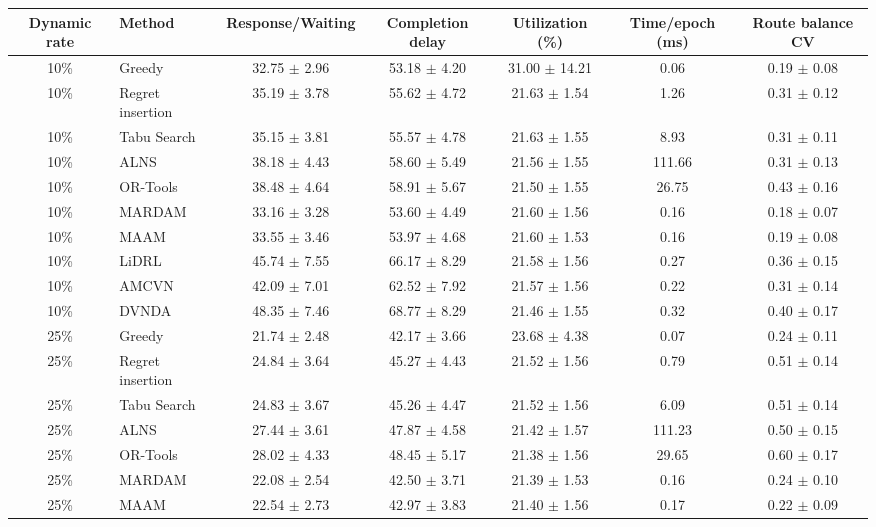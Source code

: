 \begin{tabular}{clccccc}
\toprule
Dynamic rate & Method & Response/Waiting & Completion delay & Utilization (\%) & Time/epoch (ms) & Route balance CV \\
\midrule
10\% & Greedy & 32.75 $\pm$ 2.96 & 53.18 $\pm$ 4.20 & 31.00 $\pm$ 14.21 & 0.06 & 0.19 $\pm$ 0.08 \\
10\% & Regret insertion & 35.19 $\pm$ 3.78 & 55.62 $\pm$ 4.72 & 21.63 $\pm$ 1.54 & 1.26 & 0.31 $\pm$ 0.12 \\
10\% & Tabu Search & 35.15 $\pm$ 3.81 & 55.57 $\pm$ 4.78 & 21.63 $\pm$ 1.55 & 8.93 & 0.31 $\pm$ 0.11 \\
10\% & ALNS & 38.18 $\pm$ 4.43 & 58.60 $\pm$ 5.49 & 21.56 $\pm$ 1.55 & 111.66 & 0.31 $\pm$ 0.13 \\
10\% & OR-Tools & 38.48 $\pm$ 4.64 & 58.91 $\pm$ 5.67 & 21.50 $\pm$ 1.55 & 26.75 & 0.43 $\pm$ 0.16 \\
10\% & MARDAM & 33.16 $\pm$ 3.28 & 53.60 $\pm$ 4.49 & 21.60 $\pm$ 1.56 & 0.16 & 0.18 $\pm$ 0.07 \\
10\% & MAAM & 33.55 $\pm$ 3.46 & 53.97 $\pm$ 4.68 & 21.60 $\pm$ 1.53 & 0.16 & 0.19 $\pm$ 0.08 \\
10\% & LiDRL & 45.74 $\pm$ 7.55 & 66.17 $\pm$ 8.29 & 21.58 $\pm$ 1.56 & 0.27 & 0.36 $\pm$ 0.15 \\
10\% & AMCVN & 42.09 $\pm$ 7.01 & 62.52 $\pm$ 7.92 & 21.57 $\pm$ 1.56 & 0.22 & 0.31 $\pm$ 0.14 \\
10\% & DVNDA & 48.35 $\pm$ 7.46 & 68.77 $\pm$ 8.29 & 21.46 $\pm$ 1.55 & 0.32 & 0.40 $\pm$ 0.17 \\
25\% & Greedy & 21.74 $\pm$ 2.48 & 42.17 $\pm$ 3.66 & 23.68 $\pm$ 4.38 & 0.07 & 0.24 $\pm$ 0.11 \\
25\% & Regret insertion & 24.84 $\pm$ 3.64 & 45.27 $\pm$ 4.43 & 21.52 $\pm$ 1.56 & 0.79 & 0.51 $\pm$ 0.14 \\
25\% & Tabu Search & 24.83 $\pm$ 3.67 & 45.26 $\pm$ 4.47 & 21.52 $\pm$ 1.56 & 6.09 & 0.51 $\pm$ 0.14 \\
25\% & ALNS & 27.44 $\pm$ 3.61 & 47.87 $\pm$ 4.58 & 21.42 $\pm$ 1.57 & 111.23 & 0.50 $\pm$ 0.15 \\
25\% & OR-Tools & 28.02 $\pm$ 4.33 & 48.45 $\pm$ 5.17 & 21.38 $\pm$ 1.56 & 29.65 & 0.60 $\pm$ 0.17 \\
25\% & MARDAM & 22.08 $\pm$ 2.54 & 42.50 $\pm$ 3.71 & 21.39 $\pm$ 1.53 & 0.16 & 0.24 $\pm$ 0.10 \\
25\% & MAAM & 22.54 $\pm$ 2.73 & 42.97 $\pm$ 3.83 & 21.40 $\pm$ 1.56 & 0.17 & 0.22 $\pm$ 0.09 \\

\end{tabular}
